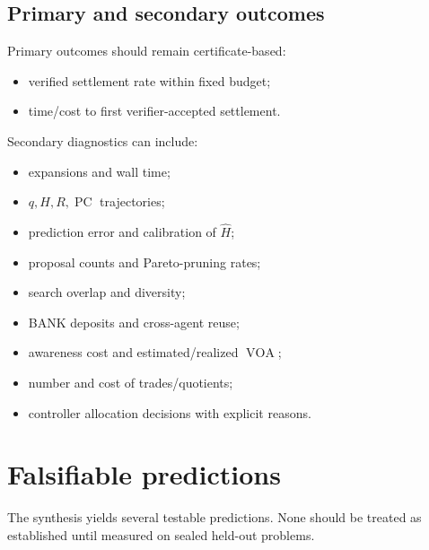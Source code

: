 \documentclass[11pt]{article}
\theoremstyle{definition}
\theoremstyle{remark}
\newcommand{\PC}{\operatorname{PC}}
\newcommand{\VOA}{\operatorname{VOA}}
\begin{document}
\subsection{Primary and secondary outcomes}

Primary outcomes should remain certificate-based:
\begin{itemize}
\item verified settlement rate within fixed budget;
\item time/cost to first verifier-accepted settlement.
\end{itemize}
Secondary diagnostics can include:
\begin{itemize}
\item expansions and wall time;
\item $q,H,R,\PC$ trajectories;
\item prediction error and calibration of $\widehat H$;
\item proposal counts and Pareto-pruning rates;
\item search overlap and diversity;
\item BANK deposits and cross-agent reuse;
\item awareness cost and estimated/realized $\VOA$;
\item number and cost of trades/quotients;
\item controller allocation decisions with explicit reasons.
\end{itemize}

\section{Falsifiable predictions}

The synthesis yields several testable predictions. None should be treated as established until measured on sealed held-out problems.
\end{document}
